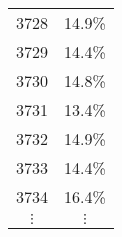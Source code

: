 \documentclass[11pt]{beamer}
\begin{document}
\begin{frame}
\begin{columns}
\begin{column}{5cm}
\begin{center}
{\begin{tabular}{|c|c|}
3728

& 

14.9\%

\\



3729

& 

14.4\%

\\



3730

& 

14.8\%

\\


{\color[rgb]{1,0,0}
3731
}
& 
{\color[rgb]{1,0,0}
13.4\%
}
\\



3732

& 

14.9\%

\\



3733

& 

14.4\%

\\



3734

& 

16.4\%

\\

$\vdots$ & $\vdots$\\
\hline
\end{tabular}

}
\end{center}
\end{column}
\begin{column}{5cm}







\end{column}
\end{columns}
\end{frame}
\end{document}
